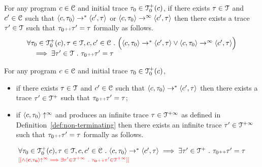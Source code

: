 \begin{lem}
  \label{lem:tracenondec}
  For any program $c \in \mathcal{C}$ and initial trace $\mathtt{\tau}_0 \in \mathcal{T}^{+}_0(c)$,
  if there exists $\mathtt{\tau} \in \mathcal{T}$ and $c' \in \mathcal{C} $ such that $\langle c, \mathtt{\tau}_0 \rangle \rightarrow^{*} \langle c', \mathtt{\tau} \rangle $ or 
  $\langle c, \mathtt{\tau}_0 \rangle \rightarrow^{\infty} \langle c', \mathtt{\tau} \rangle$  
  then there exists a trace $\mathtt{\tau}' \in \mathcal{T}$ such that $\mathtt{\tau}_0 {\scriptscriptstyle ++} \mathtt{\tau}' = \mathtt{\tau}$ formally as follows.
  \[
    \begin{array}{l}
    \forall \mathtt{\tau}_0 \in \mathcal{T}^{+}_0(c), \mathtt{\tau} \in \mathcal{T}, c, c' \in \mathcal{C} ~.~
    \Big( \langle c, \mathtt{\tau}_0 \rangle \rightarrow^{*} \langle c', \mathtt{\tau} \rangle 
    \lor  \langle c, \mathtt{\tau}_0 \rangle \rightarrow^{\infty} \langle c', \mathtt{\tau} \rangle \Big)
    \\ \quad
    \implies \exists \mathtt{\tau}' \in \mathcal{T} ~.~ \mathtt{\tau}_0 {\scriptscriptstyle ++} \mathtt{\tau}' = \mathtt{\tau} 
    \end{array}
    \]
  \end{lem}
  \begin{lem}
    \label{lem:tracenondec2}
    For any program $c \in \mathcal{C}$ and initial trace $\mathtt{\tau}_0 \in \mathcal{T}^{+}_0(c)$,
    \begin{itemize}
      \item if there exists $\mathtt{\tau} \in \mathcal{T}$ and $c' \in \mathcal{C} $ such that $\langle c, \mathtt{\tau}_0 \rangle \rightarrow^{*} \langle c', \mathtt{\tau} \rangle $
      then there exists a trace $\mathtt{\tau}' \in \mathcal{T}^{+}$ such that $\mathtt{\tau}_0 {\scriptscriptstyle ++} \mathtt{\tau}' = \mathtt{\tau}$;
      \item if $\langle c, \mathtt{\tau}_0 \rangle \uparrow^{\infty} $ and produces an infinite trace $\mathtt{\tau} \in \mathcal{T}^{+\infty}$ as defined in Definition~\ref{def:non-terminating}
      then there exists an infinite trace $\mathtt{\tau}' \in \mathcal{T}^{+\infty}$ such that $\mathtt{\tau}_0 {\scriptscriptstyle ++} \mathtt{\tau}' = \mathtt{\tau}$ formally as follows.  
    \end{itemize}
    \[
      \begin{array}{l}
      \forall \mathtt{\tau}_0 \in \mathcal{T}^{+}_0(c), \mathtt{\tau} \in \mathcal{T}, c, c' \in \mathcal{C} ~.~
      \langle c, \mathtt{\tau}_0 \rangle \rightarrow^{*} \langle c', \mathtt{\tau} \rangle 
      \implies \exists \mathtt{\tau}' \in \mathcal{T}^{+} ~.~ \mathtt{\tau}_0 {\scriptscriptstyle ++} \mathtt{\tau}' = \mathtt{\tau} 
      \\
      {\scriptstyle \color{red}\mathbf{[[ \land \langle c, \mathtt{\tau}_0 \rangle \uparrow^{\infty} \implies \exists \mathtt{\tau}' \in \mathcal{T}^{+\infty} ~.~ \mathtt{\tau}_0 {\scriptscriptstyle ++} \mathtt{\tau}' \in \mathcal{T}^{+\infty} ]]}}
      \end{array}
      \]
    \end{lem}